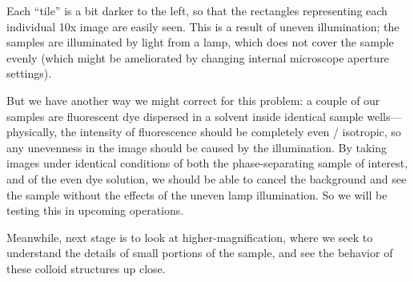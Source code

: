 Each ``tile'' is a bit darker to the left, so that the rectangles representing
each individual 10x image are easily seen. This is a result of uneven
illumination; the samples are illuminated by light from a lamp, which does not
cover the sample evenly (which might be ameliorated by changing internal
microscope aperture settings).

But we have another way we might correct for this problem: a couple of our
samples are fluorescent dye dispersed in a solvent inside identical sample
wells---physically, the intensity of fluorescence should be completely even /
isotropic, so any unevenness in the image should be caused by the illumination.
By taking images under identical conditions of both the phase-separating sample
of interest, and of the even dye solution, we should be able to cancel the
background and see the sample without the effects of the uneven lamp
illumination. So we will be testing this in upcoming operations.

Meanwhile, next stage is to look at higher-magnification, where we seek to
understand the details of small portions of the sample, and see the behavior of
these colloid structures up close.